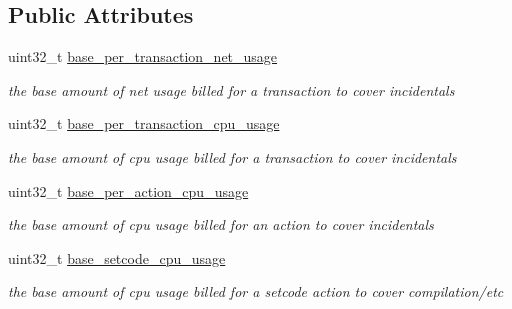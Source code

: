 \subsection*{Public Attributes}
\begin{DoxyCompactItemize}
\item 
\mbox{\label{structaacio_1_1chain_1_1chain__config_a40fb6e660728a0a71af07d6d3cf2fdcf}} 
uint32\+\_\+t \mbox{\hyperlink{structaacio_1_1chain_1_1chain__config_a40fb6e660728a0a71af07d6d3cf2fdcf}{base\+\_\+per\+\_\+transaction\+\_\+net\+\_\+usage}}
\begin{DoxyCompactList}\small\item\em the base amount of net usage billed for a transaction to cover incidentals \end{DoxyCompactList}\item 
\mbox{\label{structaacio_1_1chain_1_1chain__config_a2c3d9033baa23bce41e015842703ab7f}} 
uint32\+\_\+t \mbox{\hyperlink{structaacio_1_1chain_1_1chain__config_a2c3d9033baa23bce41e015842703ab7f}{base\+\_\+per\+\_\+transaction\+\_\+cpu\+\_\+usage}}
\begin{DoxyCompactList}\small\item\em the base amount of cpu usage billed for a transaction to cover incidentals \end{DoxyCompactList}\item 
\mbox{\label{structaacio_1_1chain_1_1chain__config_ac54fe08fd9e1b65a340620546e7e0e85}} 
uint32\+\_\+t \mbox{\hyperlink{structaacio_1_1chain_1_1chain__config_ac54fe08fd9e1b65a340620546e7e0e85}{base\+\_\+per\+\_\+action\+\_\+cpu\+\_\+usage}}
\begin{DoxyCompactList}\small\item\em the base amount of cpu usage billed for an action to cover incidentals \end{DoxyCompactList}\item 
\mbox{\label{structaacio_1_1chain_1_1chain__config_a6027ab231aa61a5fef5e10451fa2dcd5}} 
uint32\+\_\+t \mbox{\hyperlink{structaacio_1_1chain_1_1chain__config_a6027ab231aa61a5fef5e10451fa2dcd5}{base\+\_\+setcode\+\_\+cpu\+\_\+usage}}
\begin{DoxyCompactList}\small\item\em the base amount of cpu usage billed for a setcode action to cover compilation/etc \end{DoxyCompactList}\item 

\end{DoxyCompactItemize}
